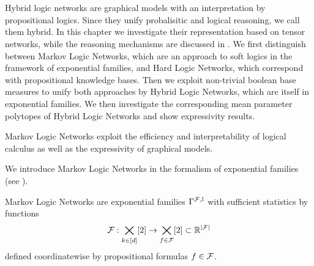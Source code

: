 \chapter{\chatextnetworkRepresentation}\label{cha:networkRepresentation}

Hybrid logic networks are graphical models with an interpretation by propositional logics.
Since they unify probalisitic and logical reasoning, we call them hybrid.
In this chapter we investigate their representation based on tensor networks, while the reasoning mechanisms are discussed in .
We first distinguish between Markov Logic Networks, which are an approach to soft logics in the framework of exponential families, and Hard Logic Networks, which correspond with propositional knowledge bases.
Then we exploit non-trivial boolean base measures to unify both approaches by Hybrid Logic Networks, which are itself in exponential families.
We then investigate the corresponding mean parameter polytopes of Hybrid Logic Networks and show expressivity results.




Markov Logic Networks exploit the efficiency and interpretability of logical calculus as well as the expressivity of graphical models.


We introduce Markov Logic Networks in the formalism of exponential families (see ).

\begin{definition}
    \label{def:mln}
    Markov Logic Networks are exponential families $\Gamma^{\mathcal{F},\mathbb{I}}$ with sufficient statistics by functions
    \begin{align*}
        \mathcal{F} : \bigtimes_{k\in[d]}[2] \rightarrow \bigtimes_{f\in\mathcal{F}}[2] \subset \mathbb{R}^{\left|\mathcal{F}\right|}
    \end{align*}
    defined coordinatewise by propositional formulas $f\in\mathcal{F}$.
\end{definition}

